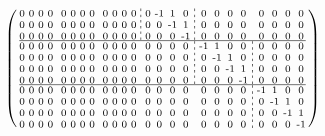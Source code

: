 \documentclass[pdftex,a4paper,parskip,listof=totoc,bibliography=totoc,onehalfspacing,12pt]{scrreprt}
\newcommand*\dashline{\hspace{-0.3em}\rotatebox[origin=c]{90}{\scalebox{-0.3}[1]{$-~~-$}}\hspace{-0.3em}}
\begin{document}
\begin{align*}
\begin{psmallmatrix}
0 & 0 & 0 & 0 && 0 & 0 & 0 & 0 && 0 & 0 & 0 & 0 &\dashline& 0 & \text{-}1 & 1 & 0 &\dashline& 0 & 0 & 0 & 0 && 0 & 0 & 0 & 0 \\
0 & 0 & 0 & 0 && 0 & 0 & 0 & 0 && 0 & 0 & 0 & 0 &\dashline& 0 & 0 & \text{-}1 & 1 &\dashline& 0 & 0 & 0 & 0 && 0 & 0 & 0 & 0 \\
0 & 0 & 0 & 0 && 0 & 0 & 0 & 0 && 0 & 0 & 0 & 0 &\dashline& 0 & 0 & 0 & \text{-}1 &\dashline& 0 & 0 & 0 & 0 && 0 & 0 & 0 & 0 \\\hline
0 & 0 & 0 & 0 && 0 & 0 & 0 & 0 && 0 & 0 & 0 & 0 && 0 & 0 & 0 & 0 &\dashline& \text{-}1 & 1 & 0 & 0 &\dashline& 0 & 0 & 0 & 0 \\
0 & 0 & 0 & 0 && 0 & 0 & 0 & 0 && 0 & 0 & 0 & 0 && 0 & 0 & 0 & 0 &\dashline& 0 & \text{-}1 & 1 & 0 &\dashline& 0 & 0 & 0 & 0 \\
0 & 0 & 0 & 0 && 0 & 0 & 0 & 0 && 0 & 0 & 0 & 0 && 0 & 0 & 0 & 0 &\dashline& 0 & 0 & \text{-}1 & 1 &\dashline& 0 & 0 & 0 & 0 \\
0 & 0 & 0 & 0 && 0 & 0 & 0 & 0 && 0 & 0 & 0 & 0 && 0 & 0 & 0 & 0 &\dashline& 0 & 0 & 0 & \text{-}1 &\dashline& 0 & 0 & 0 & 0 \\\hline
0 & 0 & 0 & 0 && 0 & 0 & 0 & 0 && 0 & 0 & 0 & 0 && 0 & 0 & 0 & 0 && 0 & 0 & 0 & 0 &\dashline& \text{-}1 & 1 & 0 & 0 \\
0 & 0 & 0 & 0 && 0 & 0 & 0 & 0 && 0 & 0 & 0 & 0 && 0 & 0 & 0 & 0 && 0 & 0 & 0 & 0 &\dashline& 0 & \text{-}1 & 1 & 0 \\
0 & 0 & 0 & 0 && 0 & 0 & 0 & 0 && 0 & 0 & 0 & 0 && 0 & 0 & 0 & 0 && 0 & 0 & 0 & 0 &\dashline& 0 & 0 & \text{-}1 & 1 \\
0 & 0 & 0 & 0 && 0 & 0 & 0 & 0 && 0 & 0 & 0 & 0 && 0 & 0 & 0 & 0 && 0 & 0 & 0 & 0 &\dashline& 0 & 0 & 0 & \text{-}1 \\
\end{psmallmatrix}
\end{align*}
\end{document}
